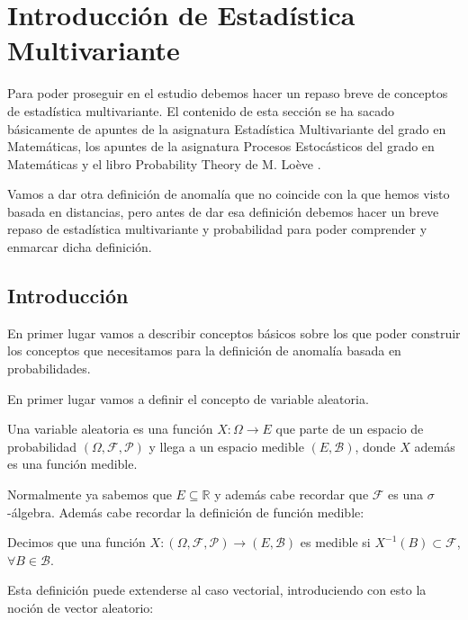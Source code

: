 \chapter{Introducción de Estadística Multivariante}
\label{chapter:estadistica_multivariante}

Para poder proseguir en el estudio debemos hacer un repaso breve de conceptos de estadística multivariante. El contenido de esta sección se ha sacado básicamente de apuntes de la asignatura Estadística Multivariante del grado en Matemáticas, los apuntes de la asignatura Procesos Estocásticos del grado en Matemáticas y el libro Probability Theory de M. Loève \cite{m_loeve_probability_1977}.

Vamos a dar otra definición de anomalía que no coincide con la que hemos visto basada en distancias, pero antes de dar esa definición debemos hacer un breve repaso de estadística multivariante y probabilidad para poder comprender y enmarcar dicha definición.

\section{Introducción}

En primer lugar vamos a describir conceptos básicos sobre los que poder construir los conceptos que necesitamos para la definición de anomalía basada en probabilidades.

En primer lugar vamos a definir el concepto de variable aleatoria.

\begin{definicion}
	Una variable aleatoria es una función $X:\Omega \rightarrow E$ que parte de un espacio de probabilidad $(\Omega , \mathcal{F}, \mathcal{P})$ y llega a un espacio medible $(E, \mathcal{B})$, donde $X$ además es una función medible.
\end{definicion}

Normalmente ya sabemos que $E\subseteq \mathbb{R}$ y además cabe recordar que $\mathcal{F}$ es una $\sigma$-álgebra. Además cabe recordar la definición de función medible:

\begin{definicion}
	Decimos que una función $X: (\Omega , \mathcal{F}, \mathcal{P}) \rightarrow (E, \mathcal{B})$ es medible si $X^{-1}(B)\subset \mathcal{F}$, $\forall B \in \mathcal{B}$.
\end{definicion}

Esta definición puede extenderse al caso vectorial, introduciendo con esto la noción de vector aleatorio:

